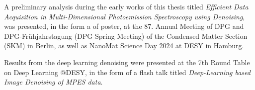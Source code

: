 A preliminary analysis during the early works of this thesis titled
\textit{Efficient Data Acquisition in Multi-Dimensional Photoemission Spectroscopy using Denoising}, was presented, in the form a of poster, at the 87. Annual Meeting of DPG and DPG-Frühjahrstagung (DPG Spring Meeting) of the Condensed Matter Section (SKM) in Berlin, as well as NanoMat Science Day 2024 at DESY in Hamburg. 

Results from the deep learning denoising were presented at the \num{7}th Round Table on Deep Learning $@$DESY, in the form of a flash talk titled \textit{Deep-Learning based Image Denoising of MPES data}.